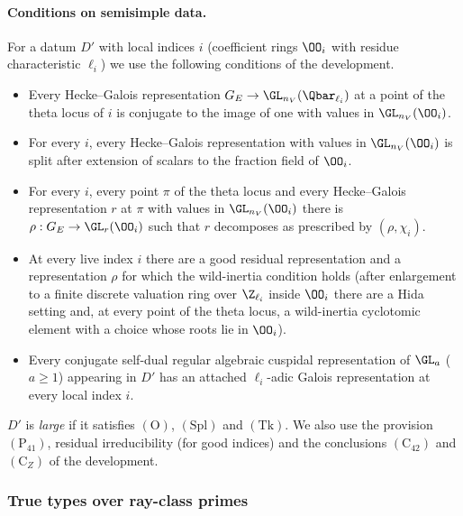 \paragraph{Conditions on semisimple data.} For a datum $D'$ with local indices $i$ (coefficient rings
$\OO_i$ with residue characteristic $\ell_i$) we use the following conditions of the development.
\begin{itemize}
\item[$(\mathrm{O})$] Every Hecke--Galois representation $G_E\to\GL_{n_V}(\Qbar_{\ell_i})$ at a point of the theta
  locus of $i$ is conjugate to the image of one with values in $\GL_{n_V}(\OO_i)$.
\item[$(\mathrm{Spl})$] For every $i$, every Hecke--Galois representation with values in $\GL_{n_V}(\OO_i)$ is split
  after extension of scalars to the fraction field of $\OO_i$.
\item[$(\mathrm{Dec})$] For every $i$, every point $\pi$ of the theta locus and every Hecke--Galois representation
  $r$ at $\pi$ with values in $\GL_{n_V}(\OO_i)$ there is $\rho:G_E\to\GL_r(\OO_i)$ such that $r$ decomposes as
  prescribed by $(\rho,\chi_i)$.
\item[$(\mathrm{Tk})$] At every live index $i$ there are a good residual representation and a representation
  $\rho$ for which the wild-inertia condition holds (after enlargement to a finite discrete valuation ring over
  $\Z_{\ell_i}$ inside $\OO_i$ there are a Hida setting and, at every point of the theta locus, a wild-inertia
  cyclotomic element with a choice whose roots lie in $\OO_i$).
\item[$(\mathrm{GR})$] Every conjugate self-dual regular algebraic cuspidal representation of $\GL_a$ ($a\ge1$)
  appearing in $D'$ has an attached $\ell_i$-adic Galois representation at every local index $i$.
\end{itemize}
$D'$ is \emph{large} if it satisfies $(\mathrm{O})$, $(\mathrm{Spl})$ and $(\mathrm{Tk})$. We also use the provision
$(\mathrm{P}_{41})$, residual irreducibility (for good indices) and the conclusions $(\mathrm{C}_{42})$ and
$(\mathrm{C}_{Z})$ of the development.

\subsubsection{True types over ray-class primes}

